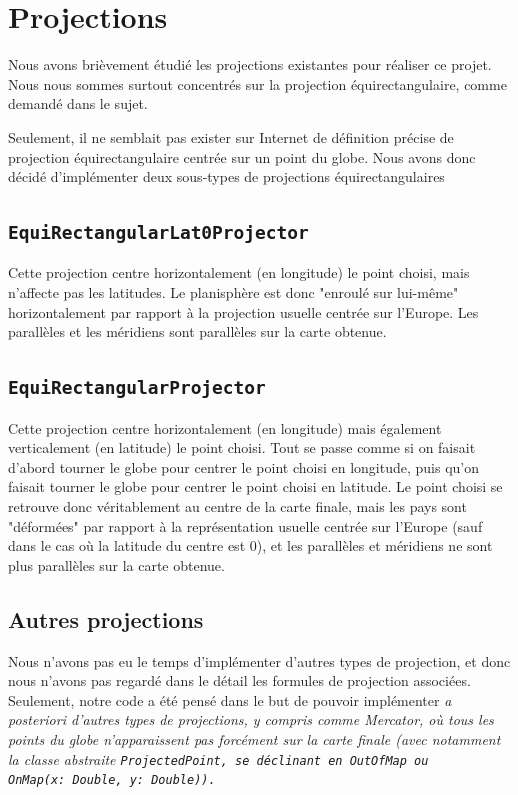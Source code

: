 \documentclass[a4paper, 12pt]{report}
\newcommand{\en}[1]{\it{#1}}
\begin{document}
\section{Projections}

Nous avons brièvement étudié les projections existantes pour réaliser ce projet. Nous nous sommes surtout concentrés sur la projection équirectangulaire, comme demandé dans le sujet.

Seulement, il ne semblait pas exister sur Internet de définition précise de projection équirectangulaire centrée sur un point du globe. Nous avons donc décidé d'implémenter deux sous-types de projections équirectangulaires

\subsection{\tt{EquiRectangularLat0Projector}}

Cette projection centre horizontalement (en longitude) le point choisi, mais n'affecte pas les latitudes. Le planisphère est donc "enroulé sur lui-même" horizontalement par rapport à la projection usuelle centrée sur l'Europe. Les parallèles et les méridiens sont parallèles sur la carte obtenue. 

\subsection{\tt{EquiRectangularProjector}}

Cette projection centre horizontalement (en longitude) mais également verticalement (en latitude) le point choisi. Tout se passe comme si on faisait d'abord tourner le globe pour centrer le point choisi en longitude, puis qu'on faisait tourner le globe pour centrer le point choisi en latitude. Le point choisi se retrouve donc véritablement au centre de la carte finale, mais les pays sont "déformées" par rapport à la représentation usuelle centrée sur l'Europe (sauf dans le cas où la latitude du centre est $0$), et les parallèles et méridiens ne sont plus parallèles sur la carte obtenue.

\subsection{Autres projections}

Nous n'avons pas eu le temps d'implémenter d'autres types de projection, et donc nous n'avons pas regardé dans le détail les formules de projection associées. Seulement, notre code a été pensé dans le but de pouvoir implémenter \en{a posteriori} d'autres types de projections, y compris comme Mercator, où tous les points du globe n'apparaissent pas forcément sur la carte finale (avec notamment la classe abstraite \tt{ProjectedPoint}, se déclinant en \tt{OutOfMap} ou \\\tt{OnMap(x: Double, y: Double)}).
\end{document}
